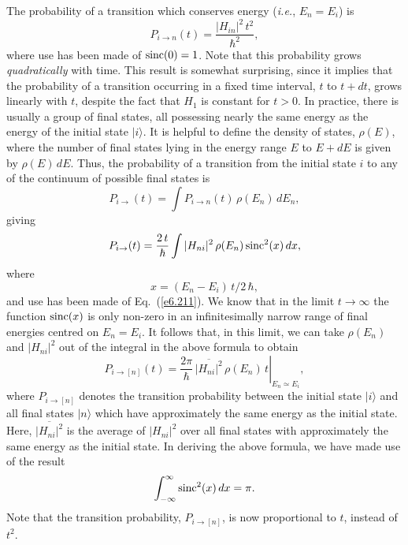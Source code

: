 The probability of a transition which conserves energy ({\em i.e.}, $E_n = E_i$)
is
\begin{equation}
P_{i\rightarrow n} (t) = \frac{|H_{in}|^2\,t^2}{\hbar^2},
\end{equation}
where use has been made of ${\rm sinc}(0) = 1$. Note that this probability
grows {\em quadratically} with time. This result is somewhat surprising, since
it implies that the probability of a transition occurring in a fixed
time interval, $t$ to $t+dt$, grows linearly with $t$, despite the fact that
$H_1$ is constant for $t>0$. In practice, there is usually a group of
final states, all possessing  nearly the same energy as the energy of the
initial state $|i\rangle$. It is helpful to define the density of
states, $\rho(E)$, where the number of final states lying in the
energy range $E$ to $E+dE$ is given by $\rho(E)\,dE$. Thus, the
probability of a transition from the initial state $i$ to any of
the continuum of possible final states is
\begin{equation}
P_{i\rightarrow} (t) = \int P_{i\rightarrow n}(t) \,\rho(E_n)\, dE_n,
\end{equation}
giving
\begin{equation}
P_{i\rightarrow} (t) = \frac{2\, t}{\hbar} \int |H_{ni}|^2\, \rho(E_n) \,{\rm sinc}^2(x)\,dx,
\end{equation}
where 
\begin{equation}
x=(E_n-E_i)\,t/2\,\hbar,
\end{equation}
 and use has been made of Eq.~(\ref{e6.211}). We know that in the limit $t\rightarrow
\infty$ the function ${\rm sinc}(x)$ is only non-zero in an infinitesimally
narrow range of final energies  centred on $E_n = E_i$. It follows that, in this limit,
we can take
$\rho(E_n)$ and $|H_{ni}|^2$ out of the integral in the above 
formula to obtain
\begin{equation}
P_{i\rightarrow[n]} (t) = \left.\frac{2\pi}{\hbar}\, \overline{|H_{ni}|^2}
 \,\rho(E_n)\,t
\right|_{E_n\simeq E_i},
\end{equation}
where $P_{i\rightarrow [n]}$ denotes the transition probability between 
the initial state $|i\rangle$
and all final states $|n\rangle$ which have approximately the same energy
as the initial state.
Here, $\overline{|H_{ni}|^2}$ is the average of $|H_{ni}|^2$ over
all final states with approximately the same energy as the initial state.
In deriving the above formula, we have made use of the result
\begin{equation}
\int_{-\infty}^{\infty} {\rm sinc}^2(x)\,dx = \pi.
\end{equation}
Note that the transition probability, $P_{i\rightarrow [n]}$,
 is now proportional to $t$, instead
of $t^2$. 


